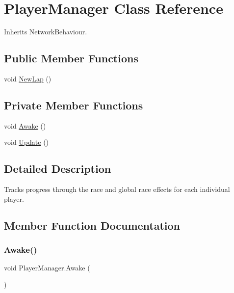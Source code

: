 \hypertarget{class_player_manager}{}\section{Player\+Manager Class Reference}
\label{class_player_manager}


Inherits Network\+Behaviour.

\subsection*{Public Member Functions}
\begin{DoxyCompactItemize}
\item 
void \hyperlink{class_player_manager_afc42c9dacfdfdf7a707f49591c1b4ace}{New\+Lap} ()
\end{DoxyCompactItemize}
\subsection*{Private Member Functions}
\begin{DoxyCompactItemize}
\item 
void \hyperlink{class_player_manager_a1416e7628e83873973f7e6bf513e2e11}{Awake} ()
\item 
void \hyperlink{class_player_manager_a845f49f829496d56defe86c77e03fa12}{Update} ()
\end{DoxyCompactItemize}


\subsection{Detailed Description}
Tracks progress through the race and global race effects for each individual player. 



\subsection{Member Function Documentation}
\mbox{\label{class_player_manager_a1416e7628e83873973f7e6bf513e2e11}} 
\subsubsection{\texorpdfstring{Awake()}{Awake()}}
{\footnotesize\ttfamily void Player\+Manager.\+Awake (\begin{DoxyParamCaption}{ }\end{DoxyParamCaption})\hspace{0.3cm}{\ttfamily [private]}}




